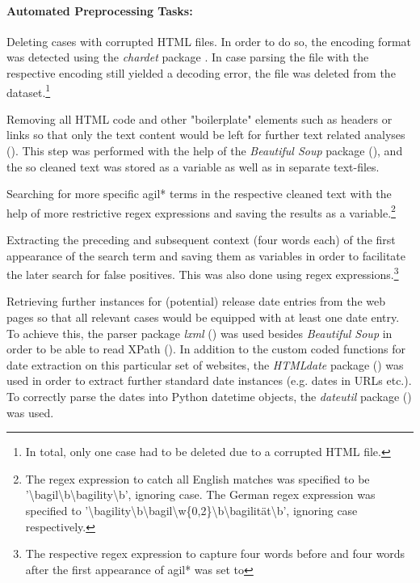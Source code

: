 \paragraph{Automated Preprocessing Tasks:} 
\begin{compactitem}
\item Deleting cases with corrupted HTML files. In order to do so, the encoding format was detected using the \textit{chardet} package \parencite{Pilgrim2015}. In case parsing the file with the respective encoding still yielded a decoding error, the file was deleted from the dataset.\footnote{In total, only one case had to be deleted due to a corrupted HTML file.}
\item Removing all HTML code and other "boilerplate" elements such as headers or links so that only the text content would be left for further text related analyses (\cite*[p. 19]{Ludeling2015}). This step was performed with the help of the \textit{Beautiful Soup} package (\cite{Richardson2007}), and the so cleaned text was stored as a variable as well as in separate text-files.
\item Searching for more specific agil* terms in the respective cleaned text with the help of more restrictive regex expressions and saving the results as a variable.\footnote{The regex expression to catch all English matches was specified to be '\textbackslash bagil\textbackslash b\textbar \textbackslash bagility\textbackslash b', ignoring case. The German regex expression was specified to '\textbackslash bagility\textbackslash b\textbar \textbackslash bagil\textbackslash w\{0,2\}\textbackslash b\textbar \textbackslash bagilität\textbackslash b', ignoring case respectively.} 
\item Extracting the preceding and subsequent context (four words each) of the first appearance of the search term and saving them as variables in order to facilitate the later search for false positives. This was also done using regex expressions.\footnote{The respective regex expression to capture four words before and four words after the first appearance of agil* was set to }
\item Retrieving further instances for (potential) release date entries from the web pages so that all relevant cases would be equipped with at least one date entry. To achieve this, the parser package \textit{lxml} (\cite{Faassen2006}) was used besides \textit{Beautiful Soup} in order to be able to read XPath (\cite{Clark1999}). In addition to the custom coded functions for date extraction on this particular set of websites, the \textit{HTMLdate} package (\cite{Barbaresi2020}) was used in order to extract further standard date instances (e.g. dates in URLs etc.). To correctly parse the dates into Python datetime objects, the \textit{dateutil} package (\cite{Niemeyer2003}) was used.

\end{compactitem}
